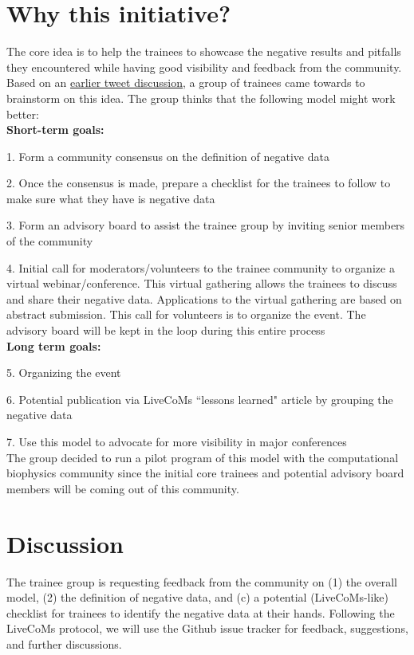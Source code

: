 \documentclass[9pt,lessons]{livecoms}
\theoremstyle{definition}
\theoremstyle{remark}
\begin{document}
\section{Why this initiative?}

The core idea is to help the trainees to showcase the negative results and pitfalls they encountered while
having good visibility and feedback from the community.
Based on an \href{https://twitter.com/poruthoor/status/1635740205373087744?s=20}{earlier tweet discussion},
a group of trainees came towards to brainstorm on this idea.
The group thinks that the following model might work better:\\

\textbf{Short-term goals:}

1. Form a community consensus on the definition of negative data

2. Once the consensus is made, prepare a checklist for the trainees to follow to make sure what they have is negative data

3. Form an advisory board to assist the trainee group by inviting senior members of the community

4. Initial call for moderators/volunteers to the trainee community to organize a virtual webinar/conference.
This virtual gathering allows the trainees to discuss and share their negative data.
Applications to the virtual gathering are based on abstract submission.
This call for volunteers is to organize the event.
The advisory board will be kept in the loop during this entire process\\

\textbf{Long term goals:}

5. Organizing the event

6. Potential publication via LiveCoMs ``lessons learned" article by grouping the negative data

7. Use this model to advocate for more visibility in major conferences\\

The group decided to run a pilot program of this model with the computational biophysics community since the initial core trainees and potential advisory board members will be coming out of this community.



\section{Discussion}

The trainee group is requesting feedback from the community on (1) the overall model,
(2) the definition of negative data, and (c) a potential (LiveCoMs-like) checklist for trainees to
identify the negative data at their hands.
Following the LiveCoMs protocol, we will use the Github issue tracker for feedback, suggestions, and further discussions.
\end{document}
